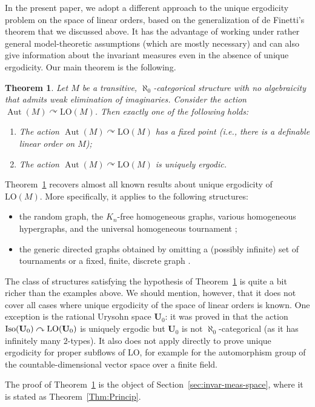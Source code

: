 \documentclass[11pt]{article}
\newcommand{\ie}{i.e.,\xspace}
\let\actson\curvearrowright
\theoremstyle{plain}
\newtheorem{theorem}{Theorem}[section]
\theoremstyle{definition}
\newcommand{\bU}{{\mathbf U}}
\DeclareMathOperator{\Aut}{Aut}
\DeclareMathOperator{\Iso}{Iso}
\newcommand{\LO}{\mathrm{LO}}
\begin{document}
In the present paper, we adopt a different approach to the unique ergodicity problem on the space of linear orders, based on the generalization of de Finetti's theorem that we discussed above. It has the advantage of working under rather general model-theoretic assumptions (which are mostly necessary) and can also give information about the invariant measures even in the absence of unique ergodicity. Our main theorem is the following.
\begin{theorem}
\label{th:intro:main} Let $M$ be a transitive, $\aleph_0$-categorical structure with no algebraicity that admits weak elimination of imaginaries. Consider the action $\Aut(M) \actson \LO(M)$. Then exactly one of the following holds:
\begin{enumerate}
\item The action $\Aut(M) \actson \LO(M)$ has a fixed point (\ie there is a definable linear order on $M$);
\item The action $\Aut(M) \actson \LO(M)$ is uniquely ergodic.
\end{enumerate}
\end{theorem}
Theorem~\ref{th:intro:main} recovers almost all known results about unique ergodicity of $\LO(M)$. More specifically, it applies to the following structures:
\begin{itemize}
\item the random graph, the $K_n$-free homogeneous graphs, various homogeneous hypergraphs, and the universal homogeneous tournament \cite{Angel2014};

\item the generic directed graphs obtained by omitting a (possibly infinite) set of tournaments or a fixed, finite, discrete graph \cite{Pawliuk2020}.
\end{itemize}
The class of structures satisfying the hypothesis of Theorem~\ref{th:intro:main} is quite a bit richer than the examples above. We should mention, however, that it does not cover all cases where unique ergodicity of the space of linear orders is known. One exception is the rational Urysohn space $\bU_0$: it was proved in \cite{Angel2014} that the action $\Iso(\bU_0) \actson\nobreak \LO(\bU_0)$ is uniquely ergodic but $\bU_0$ is not $\aleph_0$-categorical (as it has infinitely many $2$-types). It also does not apply directly to prove unique ergodicity for proper subflows of $\LO$, for example for the automorphism group of the countable-dimensional vector space over a finite field.

The proof of Theorem~\ref{th:intro:main} is the object of Section~\ref{sec:invar-meas-space}, where it is stated as Theorem~\ref{Thm:Princip}.
\end{document}
